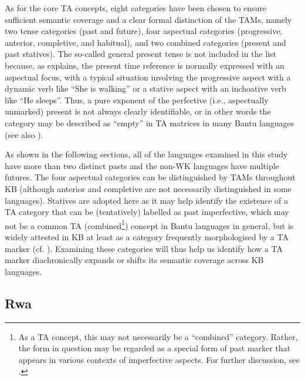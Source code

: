 \documentclass[output=paper]{langscibook}
\begin{document}
As for the core TA concepts, eight categories have been chosen to ensure sufficient semantic coverage and a clear formal distinction of the TAMs, namely two tense categories (past and future), four aspectual categories (progressive, anterior, completive, and habitual), and two combined categories (present and past statives). The so-called general present tense is not included in the list because, as \citet[115--117]{Nurse2008} explains, the present time reference is normally expressed with an aspectual focus, with a typical situation involving the progressive aspect with a dynamic verb like “She is walking” or a stative aspect with an inchoative verb like “He sleeps”. Thus, a pure exponent of the perfective (i.e., aspectually unmarked) present is not always clearly identifiable, or in other words the category may be described as “empty” in TA matrices in many Bantu languages (see also \citealt[77]{Nurse2003a}).

As shown in the following sections, all of the languages examined in this study have more than two distinct pasts and the non-WK languages have multiple futures. The four aspectual categories can be distinguished by TAMs throughout KB (although anterior and completive are not necessarily distinguished in some languages). Statives are adopted here as it may help identify the existence of a TA category that can be (tentatively) labelled as past imperfective, which may not be a common TA (combined\footnote{As a TA concept, this may not necessarily be a “combined” category. Rather, the form in question may be regarded as a special form of past marker that appears in various contexts of imperfective aspects. For further discussion, see .}) concept in Bantu languages in general, but is widely attested in KB at least as a category frequently morphologised by a TA marker (cf. \citealt[80]{Nurse2003a}). Examining these categories will thus help us identify how a TA marker diachronically expands or shifts its semantic coverage across KB languages. 

\subsection{Rwa}\label{sec:shinagawa:2.1}
\end{document}

